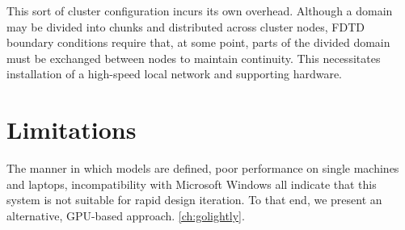 This sort of cluster configuration incurs its own overhead. Although a domain may be divided into chunks and distributed across cluster nodes, FDTD boundary conditions require that, at some point, parts of the divided domain must be exchanged between nodes to maintain continuity. This necessitates installation of a high-speed local network and supporting hardware. 

\section{Limitations}

The manner in which models are defined, poor performance on single machines and laptops, incompatibility with Microsoft Windows all indicate that this system is not suitable for rapid design iteration. To that end, we present an alternative, GPU-based approach. \ref{ch:golightly}. 
 




